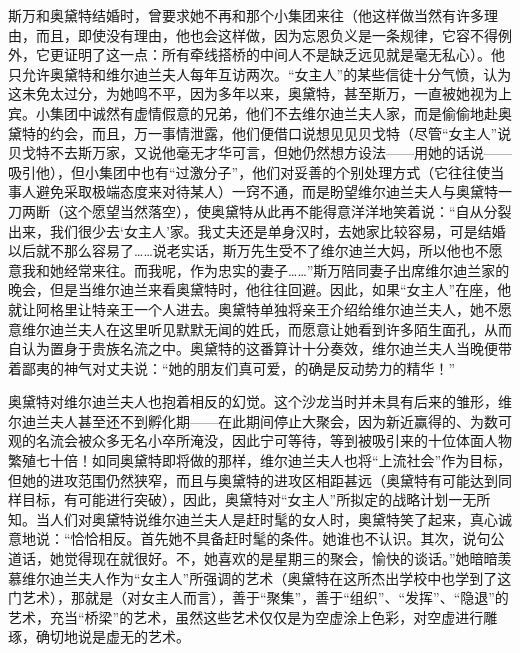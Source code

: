 \par 斯万和奥黛特结婚时，曾要求她不再和那个小集团来往（他这样做当然有许多理由，而且，即使没有理由，他也会这样做，因为忘恩负义是一条规律，它容不得例外，它更证明了这一点：所有牵线搭桥的中间人不是缺乏远见就是毫无私心）。他只允许奥黛特和维尔迪兰夫人每年互访两次。“女主人”的某些信徒十分气愤，认为这未免太过分，为她鸣不平，因为多年以来，奥黛特，甚至斯万，一直被她视为上宾。小集团中诚然有虚情假意的兄弟，他们不去维尔迪兰夫人家，而是偷偷地赴奥黛特的约会，而且，万一事情泄露，他们便借口说想见见贝戈特（尽管“女主人”说贝戈特不去斯万家，又说他毫无才华可言，但她仍然想方设法——用她的话说——吸引他），但小集团中也有“过激分子”，他们对妥善的个别处理方式（它往往使当事人避免采取极端态度来对待某人）一窍不通，而是盼望维尔迪兰夫人与奥黛特一刀两断（这个愿望当然落空），使奥黛特从此再不能得意洋洋地笑着说：“自从分裂出来，我们很少去‘女主人’家。我丈夫还是单身汉时，去她家比较容易，可是结婚以后就不那么容易了……说老实话，斯万先生受不了维尔迪兰大妈，所以他也不愿意我和她经常来往。而我呢，作为忠实的妻子……”斯万陪同妻子出席维尔迪兰家的晚会，但是当维尔迪兰来看奥黛特时，他往往回避。因此，如果“女主人”在座，他就让阿格里让特亲王一个人进去。奥黛特单独将亲王介绍给维尔迪兰夫人，她不愿意维尔迪兰夫人在这里听见默默无闻的姓氏，而愿意让她看到许多陌生面孔，从而自认为置身于贵族名流之中。奥黛特的这番算计十分奏效，维尔迪兰夫人当晚便带着鄙夷的神气对丈夫说：“她的朋友们真可爱，的确是反动势力的精华！”
\par 奥黛特对维尔迪兰夫人也抱着相反的幻觉。这个沙龙当时并未具有后来的雏形，维尔迪兰夫人甚至还不到孵化期——在此期间停止大聚会，因为新近赢得的、为数可观的名流会被众多无名小卒所淹没，因此宁可等待，等到被吸引来的十位体面人物繁殖七十倍！如同奥黛特即将做的那样，维尔迪兰夫人也将“上流社会”作为目标，但她的进攻范围仍然狭窄，而且与奥黛特的进攻区相距甚远（奥黛特有可能达到同样目标，有可能进行突破），因此，奥黛特对“女主人”所拟定的战略计划一无所知。当人们对奥黛特说维尔迪兰夫人是赶时髦的女人时，奥黛特笑了起来，真心诚意地说：“恰恰相反。首先她不具备赶时髦的条件。她谁也不认识。其次，说句公道话，她觉得现在就很好。不，她喜欢的是星期三的聚会，愉快的谈话。”她暗暗羡慕维尔迪兰夫人作为“女主人”所强调的艺术（奥黛特在这所杰出学校中也学到了这门艺术），那就是（对女主人而言），善于“聚集”，善于“组织”、“发挥”、“隐退”的艺术，充当“桥梁”的艺术，虽然这些艺术仅仅是为空虚涂上色彩，对空虚进行雕琢，确切地说是虚无的艺术。
